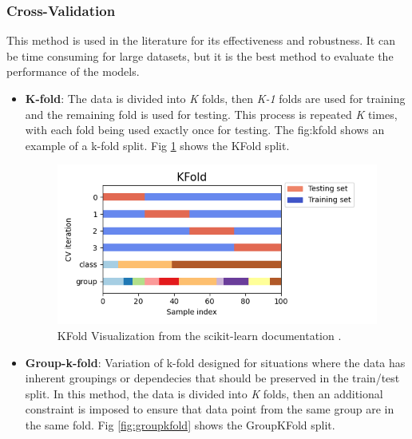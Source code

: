             \subsubsection{Cross-Validation}
                
                This method is used in the literature for its effectiveness and robustness. It can be time consuming for large datasets, but it is the best method to evaluate the performance of the models.

                \begin{itemize}

                    \item \textbf{K-fold}: The data is divided into \textit{K} folds, then \textit{K-1} folds are used for training and the remaining fold is used for testing. This process is repeated \textit{K} times, with each fold being used exactly once for testing. The fig:kfold shows an example of a k-fold split. Fig \ref{fig:kfold} shows the KFold split.
                    
                    \begin{figure}[H]
                        \centering
                        \includegraphics[width=1.0\textwidth]{../src/resources/kfold.png}
                        \caption{
                          KFold Visualization from the scikit-learn documentation \cite{scikit-learn}.
                        }
                        \label{fig:kfold}
                    \end{figure}

                    \item \textbf{Group-k-fold}: Variation of k-fold designed for situations where the data has inherent groupings or dependecies that should be preserved in the train/test split. In this method, the data is divided into \textit{K} folds, then an additional constraint is imposed to ensure that data point from the same group are in the same fold. Fig \ref{fig:groupkfold} shows the GroupKFold split.
                    

\end{itemize}
